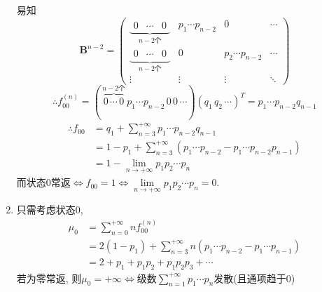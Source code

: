 \begin{solution}[1]
\begin{enumerate}[label=(\alph*)]
\[		      \]
		      易知
		      \[
			      \bm{B}^{n-2} =
			      \begin{pmatrix}
				      \underbrace{\begin{matrix}0 & \cdots & 0 \end{matrix}}_{n-2\text{个}} & p_1\cdots p_{n-2} & 0                 & \cdots \\
				      \underbrace{\begin{matrix}0 & \cdots & 0 \end{matrix}}_{n-2\text{个}} & 0                 & p_2\cdots p_{n-2} & \cdots \\
				      \vdots                                                               & \vdots            & \vdots            & \ddots
			      \end{pmatrix}
		      \]
		      \[\therefore f^{(n)}_{00} = (\,\overbrace{0\,\cdots\,0}^{n-2\text{个}}\,p_1\cdots p_{n-2}\,0\,0\,\cdots)(q_1\,q_2\,\cdots)^T = p_1\cdots p_{n-2}q_{n-1}\]
		      \[
			      \begin{split}
				      \therefore f_{00} & = q_1 + \sum^{+\infty}_{n=3}p_1\cdots p_{n-2}q_{n-1}\\
				      & = 1 - p_1 + \sum^{+\infty}_{n=3}(p_1\cdots p_{n-2} - p_1\cdots p_{n-2}p_{n-1})\\
				      & = 1 - \lim_{n\to +\infty}p_1 p_2\cdots p_n
			      \end{split}
		      \]
		      而状态$0$常返$\Leftrightarrow f_{00} = 1 \Leftrightarrow \lim\limits_{n\to +\infty}p_1 p_2\cdots p_n = 0$.
		\item 只需考虑状态$0$,
		      \[
			      \begin{split}
				      \mu_0 & = \sum^{+\infty}_{n=0}nf^{(n)}_{00}\\
				      & = 2(1-p_1)+\sum^{+\infty}_{n=3}n(p_1\cdots p_{n-2} - p_1 \cdots p_{n-1})\\
				      & = 2 + p_1 + p_1 p_2 + p_1 p_2 p_3 + \cdots
			      \end{split}
		      \]
		      若为零常返, 则$\mu_0 = +\infty \Leftrightarrow $级数$\sum\limits^{+\infty}_{n=1}p_1\cdots p_n$发散(且通项趋于$0$)
	\end{enumerate}
\end{solution}
